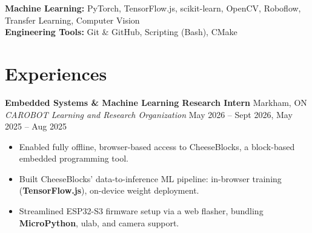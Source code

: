 \documentclass[10pt,letterpaper]{article}
\begin{document}
\hspace{0.75em}\textbf{Machine Learning:} 
PyTorch, TensorFlow.js, scikit-learn, OpenCV, Roboflow, 
Transfer Learning, Computer Vision \\

\hspace{0.75em}\textbf{Engineering Tools:} 
Git \& GitHub, Scripting (Bash), CMake \\







\section{Experiences}

\textbf{Embedded Systems \& Machine Learning Research Intern} \hfill
Markham, ON \\
\textit{CAROBOT Learning and Research Organization} \hfill 
May 2026 -- Sept 2026, May 2025 -- Aug 2025 \\
\begin{itemize}
    \item Enabled fully offline, browser-based access to CheeseBlocks, a block-based embedded programming tool.
    \item Built CheeseBlocks' data-to-inference ML pipeline: in-browser training (\textbf{TensorFlow.js}), on-device weight deployment.
    \item Streamlined ESP32-S3 firmware setup via a web flasher, bundling \textbf{MicroPython}, ulab, and camera support.
\end{itemize}
\end{document}
